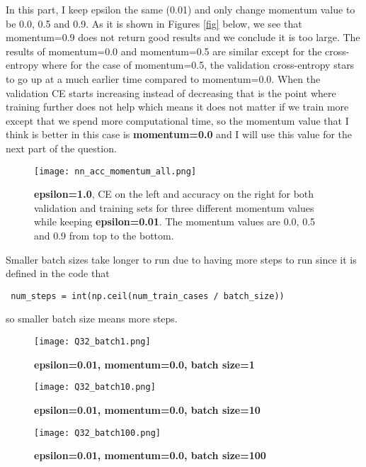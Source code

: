 \documentclass[10pt]{article}
\begin{document}
In this part, I keep epsilon the same (0.01) and only change momentum value to be 0.0, 0.5 and 0.9. As it is shown in Figures \ref{fig} below, we see that momentum=0.9 does not return good results and we conclude it is too large. The results of momentum=0.0 and momentum=0.5 are similar except for the cross-entropy where for the case of momentum=0.5, the validation cross-entropy stars to go up at a much earlier time compared to momentum=0.0. When the validation CE starts increasing instead of decreasing that is the point where training further does not help which means it does not matter if we train more except that we spend more computational time, so the momentum value that I think is better in this case is \textbf{momentum=0.0} and I will use this value for the next part of the question.

\begin{figure}[H]
	\centering
	\texttt{[image: nn\_acc\_momentum\_all.png]}
	\caption{\textbf{epsilon=1.0}, CE on the left and accuracy on the right for both validation and training sets for three different momentum values while keeping \textbf{epsilon=0.01}. The momentum values 	are 0.0, 0.5 and 0.9 from top to the bottom.}
	\label{fig:refer2}
\end{figure}

Smaller batch sizes take longer to run due to having more steps to run since it is defined in the code that \begin{verbatim} num_steps = int(np.ceil(num_train_cases / batch_size)) \end{verbatim} so smaller batch size means more steps.

\begin{figure}[H]
	\centering
	\texttt{[image: Q32\_batch1.png]}
	\caption{\textbf{epsilon=0.01, momentum=0.0, batch size=1}}
	\label{fig:Q32_batch10}
\end{figure}

\begin{figure}[H]
	\centering
	\texttt{[image: Q32\_batch10.png]}
	\caption{\textbf{epsilon=0.01, momentum=0.0, batch size=10}}
	\label{fig:Q32_batch10}
\end{figure}

\begin{figure}[H]
	\centering
	\texttt{[image: Q32\_batch100.png]}
	\caption{\textbf{epsilon=0.01, momentum=0.0, batch size=100}}
	\label{fig:Q32_batch10}
\end{figure}
\end{document}
